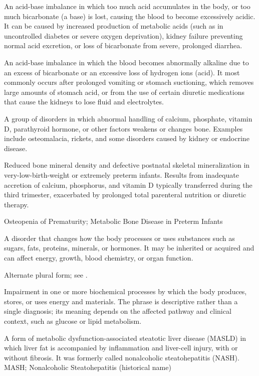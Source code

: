  An acid-base imbalance in which too much acid accumulates in the body, or too much bicarbonate (a base) is lost, causing the blood to become excessively acidic. It can be caused by increased production of metabolic acids (such as in uncontrolled diabetes or severe oxygen deprivation), kidney failure preventing normal acid excretion, or loss of bicarbonate from severe, prolonged diarrhea.

 An acid-base imbalance in which the blood becomes abnormally alkaline due to an excess of bicarbonate or an excessive loss of hydrogen ions (acid). It most commonly occurs after prolonged vomiting or stomach suctioning, which removes large amounts of stomach acid, or from the use of certain diuretic medications that cause the kidneys to lose fluid and electrolytes.

 A group of disorders in which abnormal handling of calcium, phosphate, vitamin D, parathyroid hormone, or other factors weakens or changes bone. Examples include osteomalacia, rickets, and some disorders caused by kidney or endocrine disease.

 Reduced bone mineral density and defective postnatal skeletal mineralization in very-low-birth-weight or extremely preterm infants. Results from inadequate accretion of calcium, phosphorus, and vitamin D typically transferred during the third trimester, exacerbated by prolonged total parenteral nutrition or diuretic therapy.

\synonyms
Osteopenia of Prematurity; Metabolic Bone Disease in Preterm Infants

 A disorder that changes how the body processes or uses substances such as sugars, fats, proteins, minerals, or hormones. It may be inherited or acquired and can affect energy, growth, blood chemistry, or organ function.

 Alternate plural form; see .

 Impairment in one or more biochemical processes by which the body produces, stores, or uses energy and materials. The phrase is descriptive rather than a single diagnosis; its meaning depends on the affected pathway and clinical context, such as glucose or lipid metabolism.

 A form of metabolic dysfunction-associated steatotic liver disease (MASLD) in which liver fat is accompanied by inflammation and liver-cell injury, with or without fibrosis. It was formerly called nonalcoholic steatohepatitis (NASH).
\synonyms
MASH; Nonalcoholic Steatohepatitis (historical name)

